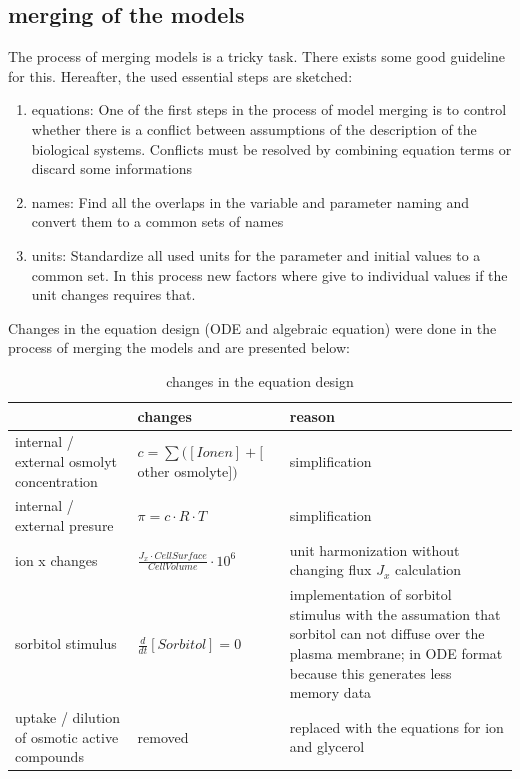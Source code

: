 \subsection{merging of the models}
The process of merging models is a tricky task. There exists some good guideline \cite{Liebermeister2008ValidityAC} for this.
Hereafter, the used essential steps are sketched:
\begin{enumerate}
	\item equations: One of the first steps in the process of model merging is to control whether there is a conflict between assumptions of the description of the biological systems. Conflicts must be resolved by combining equation terms or discard some informations
	\item names: Find all the overlaps in the variable and parameter naming and convert them to a common sets of names
	\item units: Standardize all used units for the parameter and initial values to a common set. In this process new factors where give to individual values if the unit changes requires that.
\end{enumerate}
Changes in the equation design (ODE and algebraic equation) were done in the process of merging the models and are presented below:

\begin{table} [h]
	\footnotesize
\begin{center} 
	\caption{changes in the equation design}
\begin{tabular} {p{3.5cm} l p{6cm} }
\toprule
& changes & reason\\
\midrule
internal / external osmolyt concentration & $c = \sum ([Ionen]+[$other osmolyte$])$ & simplification\\ 
\addlinespace[9pt]
internal / external presure & $\pi = c \cdot R \cdot T	$ & simplification\\
\addlinespace[9pt]
ion x changes & $\frac{J_x \cdot CellSurface}{CellVolume} \cdot 10^{6}$ & unit harmonization without changing flux $J_x$ calculation\\
\addlinespace[9pt]
sorbitol stimulus & $\frac{d}{dt}[Sorbitol]=0$ & implementation of sorbitol stimulus with the assumation that sorbitol can not diffuse over the plasma membrane; in ODE format because this generates less memory data\\
\addlinespace[9pt]
uptake / dilution of osmotic active compounds & removed & replaced with the equations for ion and glycerol\\
\bottomrule
\end{tabular}
\label{changesOnTheModels}
\end{center}
\end{table}


